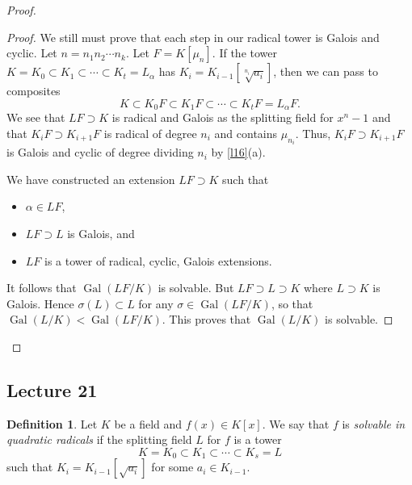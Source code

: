 \documentclass[10pt,letterpaper,cm]{nupset}
\theoremstyle{definition}
\newtheorem{definition}{Definition}[subsection]
\theoremstyle{theorem}
\theoremstyle{remark}
\newcommand{\1}{\mathbf{1}}
\newcommand{\0}{\vec 0}
\DeclareMathOperator{\gal}{Gal}
\begin{document}
\begin{proof}
\begin{proof}
\medskip


We still must prove that each step in our radical tower is Galois and cyclic. Let $n=n_1n_2 \cdots n_k$.  Let $F = K[\mu_n]$. If the tower $K = K_0 \subset K_1 \subset \cdots \subset K_t = L_{\alpha}$ has $K_i = K_{i-1}\left[\sqrt[n_i]{a_i}\right]$, then we can pass to composites $$  K \subset K_0F \subset K_1F \subset \cdots \subset K_tF = L_{\alpha}F  .$$ We see that $LF \supset K$ is radical and Galois as the splitting field for $x^n-1$ and that $K_iF \supset K_{i+1}F$ is radical of degree $n_i$ and contains $\mu_{n_i}$. Thus, $K_iF \supset K_{i+1}F$ is Galois and cyclic of degree dividing $n_i$ by \cref{l16}(a). 

\medskip

 We have constructed an extension $LF \supset K$ such that
\begin{itemize}
\item $\alpha \in LF$,
\item $LF \supset L$ is Galois, and
\item $LF$ is a tower of radical, cyclic, Galois extensions.
\end{itemize}
It follows that $\gal(LF/K)$ is solvable. But $LF \supset L \supset K$ where $L \supset K$ is Galois. Hence $\sigma(L) \subset L$ for any $\sigma \in \gal(LF/K)$, so that $\gal(L/K) < \gal(LF/K)$. This proves that $\gal(L/K)$ is solvable.
\end{proof}
\end{proof}

\subsection{Lecture 21}

\begin{definition}
Let $K$ be a field and $f(x) \in K[x]$. We say that $f$ is \textit{solvable in quadratic radicals} if the splitting field $L$ for $f$ is a tower $$K = K_0 \subset K_1 \subset \cdots \subset K_s =L   $$ such that $K_i =K_{i-1}\left[\sqrt{a_i}\right]$ for some $a_i \in K_{i-1}$.
\end{definition}
\end{document}
